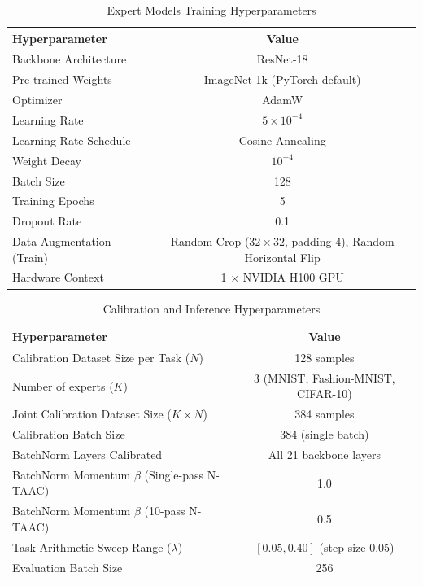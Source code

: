 \documentclass{article}
\theoremstyle{plain}
\theoremstyle{definition}
\theoremstyle{remark}
\begin{document}
\begin{table}[htbp]
\caption{Expert Models Training Hyperparameters}
\label{tab-training-hyperparams}
\begin{center}
\begin{small}
\begin{tabular}{lc}
\toprule
Hyperparameter & Value \\
\midrule
Backbone Architecture & ResNet-18 \\
Pre-trained Weights & ImageNet-1k (PyTorch default) \\
Optimizer & AdamW \\
Learning Rate & $5 \times 10^{-4}$ \\
Learning Rate Schedule & Cosine Annealing \\
Weight Decay & $10^{-4}$ \\
Batch Size & 128 \\
Training Epochs & 5 \\
Dropout Rate & 0.1 \\
Data Augmentation (Train) & Random Crop ($32\times 32$, padding 4), Random Horizontal Flip \\
Hardware Context & 1 $\times$ NVIDIA H100 GPU \\
\bottomrule
\end{tabular}
\end{small}
\end{center}
\end{table}

\begin{table}[htbp]
\caption{Calibration and Inference Hyperparameters}
\label{tab-calibration-hyperparams}
\begin{center}
\begin{small}
\begin{tabular}{lc}
\toprule
Hyperparameter & Value \\
\midrule
Calibration Dataset Size per Task ($N$) & 128 samples \\
Number of experts ($K$) & 3 (MNIST, Fashion-MNIST, CIFAR-10) \\
Joint Calibration Dataset Size ($K \times N$) & 384 samples \\
Calibration Batch Size & 384 (single batch) \\
BatchNorm Layers Calibrated & All 21 backbone layers \\
BatchNorm Momentum $\beta$ (Single-pass N-TAAC) & 1.0 \\
BatchNorm Momentum $\beta$ (10-pass N-TAAC) & 0.5 \\
Task Arithmetic Sweep Range ($\lambda$) & $[0.05, 0.40]$ (step size 0.05) \\
Evaluation Batch Size & 256 \\
\bottomrule
\end{tabular}
\end{small}
\end{center}
\end{table}
\end{document}
